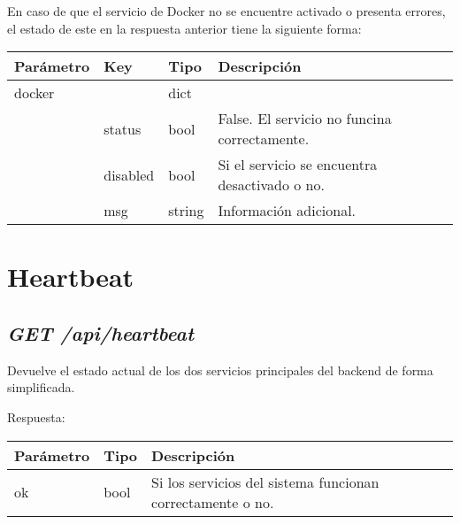 En caso de que el servicio de Docker no se encuentre activado o presenta errores, el estado de este en la respuesta anterior tiene la siguiente forma:

\begin{table}[!h]
	\centering
	
	\begin{adjustbox}{max width=\textwidth}
	\begin{tabular}{|l|l|l|l|}
		\hline
		Parámetro & Key & Tipo & Descripción \\ \hline
		docker &  & dict &  \\ \hline
		& status & bool & False. El servicio no funcina correctamente. \\ \hline
		& disabled & bool & Si el servicio se encuentra desactivado o no. \\ \hline
		& msg & string & Información adicional. \\ \hline
	\end{tabular}
	\end{adjustbox}
\end{table}






\section{Heartbeat}

\subsection{\textit{GET /api/heartbeat}}

Devuelve el estado actual de los dos servicios principales del backend de forma simplificada.

Respuesta:
\begin{table}[!h]
	\centering
\begin{adjustbox}{max width=\textwidth}
	\begin{tabular}{|l|l|l|}
		\hline
		Parámetro & Tipo & Descripción \\ \hline
		ok & bool & Si los servicios del sistema funcionan correctamente o no. \\ \hline
	\end{tabular}
\end{adjustbox}
\end{table}










